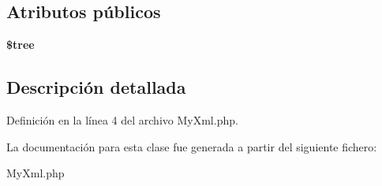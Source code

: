 \subsection*{\-Atributos públicos}
\begin{DoxyCompactItemize}
\item 
\hypertarget{classMyXml_a2f675194b628cef67cea0fecbc213be5}{{\bfseries \$tree}}\label{classMyXml_a2f675194b628cef67cea0fecbc213be5}

\end{DoxyCompactItemize}


\subsection{\-Descripción detallada}


\-Definición en la línea 4 del archivo \-My\-Xml.\-php.



\-La documentación para esta clase fue generada a partir del siguiente fichero\-:\begin{DoxyCompactItemize}
\item 
\-My\-Xml.\-php\end{DoxyCompactItemize}
